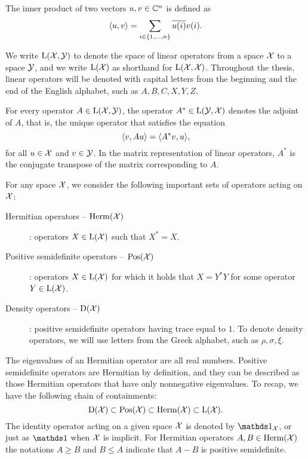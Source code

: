The inner product of two vectors $u, v \in \mathbb{C}^{n}$ is defined as
\begin{equation}
  \langle u , v\rangle = \sum_{i\in\{1,\ldots,n\}}\overline{u(i)}v(i).
\end{equation}

We write $\mathrm{L}(\mathcal{X},\mathcal{Y})$ to denote the space of linear operators from a space $\mathcal{X}$ 
to a space $\mathcal{Y}$, and we write $\mathrm{L}(\mathcal{X})$ as shorthand for $\mathrm{L}(\mathcal{X},\mathcal{X})$.
Throughout the thesis, linear operators will be denoted with capital letters from the
beginning and the end of the English alphabet, such as $A, B, C, X, Y, Z$. 

For every operator $A\in\mathrm{L}(\mathcal{X},\mathcal{Y})$, the operator $A^{\ast}\in\mathrm{L}(\mathcal{Y},\mathcal{X})$
denotes the adjoint of $A$, that is, the unique operator that satisfies the equation
\begin{equation}
  \langle v , Au\rangle = \langle A^{\ast}v , u\rangle,
\end{equation}
for all $u\in\mathcal{X}$ and $v\in\mathcal{Y}$.
In the matrix representation of linear operators, $A^{\ast}$ is the conjugate transpose of 
the matrix corresponding to $A$.

\renewcommand{\descriptionlabel}[1]{\hspace{\labelsep}\emph{#1}}

For any space $\mathcal{X}$, we consider the following important sets of operators acting on $\mathcal{X}$:
\begin{description}
\item[Hermitian operators -- $\mathrm{Herm}(\mathcal{X})$]: operators $X\in\mathrm{L}(\mathcal{X})$ such that $X^{\ast} = X$.
\item[Positive semidefinite operators -- $\mathrm{Pos}(\mathcal{X})$]: operators $X\in\mathrm{L}(\mathcal{X})$ for which it holds 
  that $X = Y^{\ast}Y$ for some operator $Y\in\mathrm{L}(\mathcal{X})$.
\item[Density operators -- $\mathrm{D}(\mathcal{X})$]: positive semidefinite operators
  having trace equal to $1$. To denote density operators, we will use letters from 
  the Greek alphabet, such as $\rho,\sigma,\xi$.
\end{description}
The eigenvalues of an Hermitian operator are all real numbers. 
Positive semidefinite operators are Hermitian by definition, and they can be
described as those Hermitian operators that have only nonnegative eigenvalues.
To recap, we have the following chain of containments:
\begin{equation}
  \mathrm{D}(\mathcal{X}) \subset \mathrm{Pos}(\mathcal{X}) \subset \mathrm{Herm}(\mathcal{X}) \subset \mathrm{L}(\mathcal{X}).
\end{equation}
The identity operator acting on a given space $\mathcal{X}$ is denoted by $\I_{\X}$, 
or just as $\I$ when $\mathcal{X}$ is implicit.
For Hermitian operators $A, B \in \mathrm{Herm}(\mathcal{X})$ the notations $A\geq B$ 
and $B \leq A$ indicate that $A - B$ is positive semidefinite.

